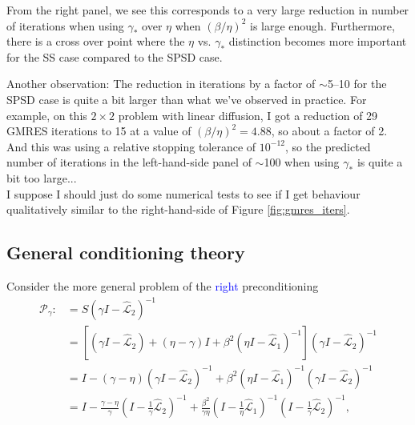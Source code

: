 \documentclass[a4paper,10pt]{article}
\newcommand{\tcb}{\textcolor{blue}}
\begin{document}
{From the right panel, we see this corresponds to a very large reduction in number of iterations when using $\gamma_*$ over $\eta$ when $(\beta/\eta)^2$ is large enough. Furthermore, there is a cross over point where the $\eta$ vs. $\gamma_*$ distinction becomes more important for the SS case compared to the SPSD case. 

Another observation: The reduction in iterations by a factor of $\sim$5--10 for the SPSD case is quite a bit larger than what we've observed in practice. For example, on this  $2 \times 2$ problem with linear diffusion, I got a reduction of 29 GMRES iterations to 15 at a value of $(\beta/\eta)^2 = 4.88$, so about a factor of 2. And this was using a relative stopping tolerance of $10^{-12}$, so the predicted number of iterations in the left-hand-side panel of $\sim$100 when using $\gamma_*$ is quite a bit too large...\\


I suppose I should just do some numerical tests to see if I get behaviour qualitatively similar to the right-hand-side of Figure \ref{fig:gmres_iters}.







\newpage
\subsection{General conditioning theory}

Consider the more general problem of the \tcb{right} preconditioning 
%
\begin{align}\nonumber
\mathcal{P}_\gamma :&=
S(\gamma I- \widehat{\mathcal{L}}_2)^{-1} \\
& = \left[ (\gamma I - \widehat{\mathcal{L}}_2) + (\eta-\gamma)I +
	\beta^2 (\eta I - \widehat{\mathcal{L}}_1)^{-1}\right]
	(\gamma I - \widehat{\mathcal{L}}_2)^{-1} \\
& = I - (\gamma - \eta)( \gamma I- \widehat{\mathcal{L}}_2)^{-1} + 
	\beta^2( \eta I-\widehat{\mathcal{L}}_1)^{-1}
	( \gamma I- \widehat{\mathcal{L}}_2)^{-1}\nonumber\\
& = I - \frac{\gamma - \eta}{\gamma} ( I- \tfrac{1}{\gamma}\widehat{\mathcal{L}}_2)^{-1} + 
	\frac{\beta^2}{\gamma\eta}( I- \tfrac{1}{\eta}\widehat{\mathcal{L}}_1)^{-1}
	( I- \tfrac{1}{\gamma}\widehat{\mathcal{L}}_2)^{-1},\label{eq:gamma2}
\end{align}




}
\end{document}
